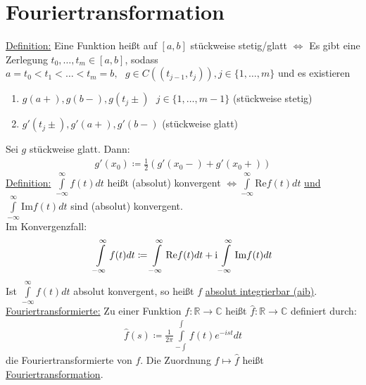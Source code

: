 \section{Fouriertransformation}
\underline{Definition:} Eine Funktion heißt auf $[a,b]$ stückweise stetig/glatt $\Leftrightarrow$ Es gibt eine Zerlegung $t_0, \ldots, t_m \in [a,b]$,
sodass $a=t_0 < t_1 < \ldots < t_m=b, \text{ } g \in C((t_{j-1},t_j)), j \in \{ 1, \ldots,m\}$ und es existieren
\begin{enumerate}
    \item $g(a+),g(b-),g(t_j\pm) \text{ } j \in \{ 1, \ldots, m-1\}$ (stückweise stetig)
    \item $g'(t_j \pm), g'(a+),g'(b-)$ (stückweise glatt)
\end{enumerate}
Sei $g$ stückweise glatt. Dann:
\begin{align*}
    g'(x_0) \coloneqq \frac{1}{2} (g'(x_0-) + g'(x_0+))
\end{align*}
\underline{Definition:} $\int \limits_{-\infty}^{\infty} f(t)dt$ heißt (absolut) konvergent $\Leftrightarrow \int \limits_{-\infty}^{\infty} \text{Re}f(t)dt$ 
\underline{und} $\int \limits_{-\infty}^{\infty} \text{Im}f(t)dt$ sind (absolut) konvergent. \\
Im Konvergenzfall: 
\begin{align*}
    \int \limits_{-\infty}^\infty f(t) dt \coloneqq  \int \limits_{-\infty}^\infty \text{Re} f(t) dt +  \text{i} \int \limits_{-\infty}^\infty \text{Im} f(t) dt
\end{align*} 
Ist $ \int \limits_{-\infty}^\infty f(t) dt$ absolut konvergent, so heißt $f$ \underline{absolut integrierbar (aib)}. \\
\underline{Fouriertransformierte:}
Zu einer Funktion $f: \mathbb{R} \to \mathbb{C}$ heißt $\widehat{f}:\mathbb{R} \to \mathbb{C}$ definiert durch:
\begin{align*}
    \widehat{f}(s) \coloneqq \frac{1}{2\pi} \int \limits_{-\int}^\int f(t) e^{-ist} dt
\end{align*}
die Fouriertransformierte von $f$. Die Zuordnung $f \mapsto \widehat{f}$ heißt \underline{Fouriertransformation}.

